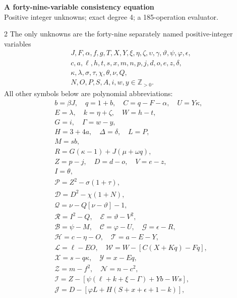 \documentclass[10pt]{article}
\begin{document}
\begin{center}
{\large\bfseries A forty-nine-variable consistency equation}\\[-1pt]
{\small Positive integer unknowns; exact degree 4; a 185-operation evaluator.}
\end{center}\vspace{-8pt}
\begin{multicols}{2}
\fontsize{8.6}{9.1}\selectfont
The only unknowns are the forty-nine separately named positive-integer variables
\[
\begin{gathered}J,F,\alpha,f,g,T,X,Y,\xi,\eta,\zeta,\upsilon,\gamma,\vartheta,\psi,\varphi,\epsilon,\\
c,a,\ell,h,t,s,x,m,n,p,j,d,o,e,z,\delta,\\
\kappa,\lambda,\sigma,\tau,\chi,\theta,\nu,Q,\\
N,O,P,S,A,i,w,y\in\mathbb Z_{>0}.\end{gathered}
\]
All other symbols below are polynomial abbreviations:
\[
\begin{gathered}
b=\beta J,\quad q=1+b,\quad C=q-F-\alpha,\quad U=Y\kappa,\\
E=\lambda,\quad k=\eta+\zeta,\quad W=h-t,\\
G=i,\quad\Gamma=w-y,\\
H=3+4a,\quad\Delta=\delta,\quad L=P,\\
M=sb,\\
R=G(\kappa-1)+J(\mu+\omega q),\\
Z=p-j,\quad D=d-o,\quad V=e-z,\\
I=\theta,\\
\mathcal{P}=Z^2-\sigma(1+\tau),\\
\mathcal{D}=D^2-\chi(1+N),\\
\mathcal{Q}=\nu-Q[\nu-\vartheta]-1,\\
\mathcal{R}=I^2-Q,\quad \mathcal{E}=\vartheta-V^2,\\
\mathcal{B}=\psi-M,\quad \mathcal{C}=\varphi-U,\quad \mathcal{G}=\epsilon-R,\\
\mathcal{H}=c-\eta-O,\quad \mathcal{T}=a-E-Y,\\
\mathcal{L}=\ell-EO,\quad \mathcal{W}=W-[C(X+Kq)-Fq],\\
\mathcal{X}=s-q\kappa,\quad \mathcal{Y}=x-Eq,\\
\mathcal{Z}=m-f^2,\quad \mathcal{N}=n-c^2,\\
\mathcal{I}=Z-[\psi(\ell+k+\xi-\Gamma)+Yb-Ws],\\
\mathcal{J}=D-[\varphi L+H(S+x+\epsilon+1-k)],\\

\end{gathered}\]
\end{multicols}
\end{document}
